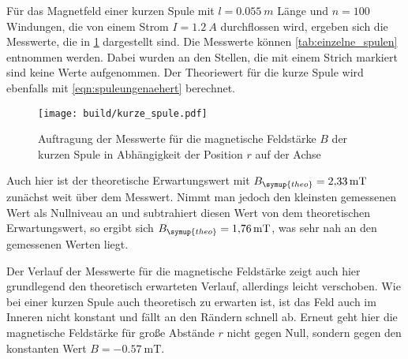 Für das Magnetfeld einer kurzen Spule mit $l=\SI{0,055}{m}$ Länge und $n=100$ Windungen,
die von einem Strom $I=\SI{1,2}{A}$ durchflossen wird, ergeben sich die Messwerte, die in
\ref{fig:kurze_spule} dargestellt sind. Die Messwerte können \ref{tab:einzelne_spulen}
entnommen werden. Dabei wurden an den Stellen, die mit einem Strich markiert sind keine
Werte aufgenommen.
Der Theoriewert für die kurze Spule wird ebenfalls mit \ref{eqn:spuleungenaehert} berechnet.

\begin{figure}
  \centering
  \texttt{[image: build/kurze\_spule.pdf]}
  \caption{Auftragung der Messwerte für die magnetische Feldstärke $B$ der kurzen Spule
  in Abhängigkeit der Position $r$ auf der Achse}
  \label{fig:kurze_spule}
\end{figure}


Auch hier ist der theoretische Erwartungswert mit $B_{\symup{theo}}=\SI{2,33}{\milli\tesla}$ zunächst
weit über dem Messwert. Nimmt man jedoch den kleinsten gemessenen Wert als Nullniveau
an und subtrahiert diesen Wert von dem theoretischen Erwartungswert, so ergibt sich
$B_{\symup{theo}}=\SI{1,76}{\milli\tesla}$, was sehr nah an den gemessenen Werten liegt.

Der Verlauf der Messwerte für die magnetische Feldstärke zeigt auch hier grundlegend
den theoretisch erwarteten Verlauf, allerdings leicht verschoben. Wie bei einer kurzen Spule auch theoretisch
zu erwarten ist, ist das Feld auch im Inneren nicht konstant und fällt an den Rändern
schnell ab. Erneut geht hier die magnetische Feldstärke für große Abstände $r$ nicht
gegen Null, sondern gegen den konstanten Wert $B=\SI{-0,57}{\milli\tesla}$.


